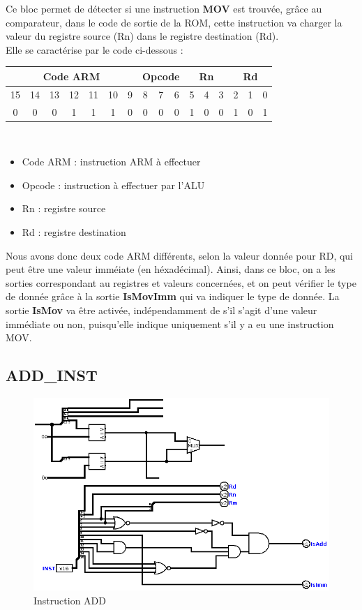 \documentclass[a4paper]{article} %
\begin{document}
\medskip

Ce bloc permet de détecter si une instruction \textbf{MOV} est trouvée, grâce au comparateur, dans le code de sortie de la ROM, cette instruction va charger la valeur du registre source (Rn) dans le registre destination (Rd).\\
Elle se caractérise par le code ci-dessous : 
\\
\begin{tabular}{|ccccccc|ccc|ccc|ccc|}
    \hline
    \multicolumn{7}{|c|}{Code ARM}  & \multicolumn{3}{|c|}{Opcode} & \multicolumn{3}{|c|}{Rn} & \multicolumn{3}{|c|}{Rd}\\
    \hline
    15 & 14 & 13 & 12 & 11 & 10 & 9 & 8 & 7 & 6                    & 5 & 4 & 3                & 2 & 1 & 0 \\
    \hline
    0  & 0  & 0  & 1  & 1  & 1  & 0 & 0 & 0 & 0                    & 1 & 0 & 0                & 1 & 0 & 1 \\
    \hline     
    \end{tabular}
\\

\begin{itemize}
    \item     Code ARM : instruction ARM à effectuer
    \item     Opcode : instruction à effectuer par l'ALU
    \item     Rn : registre source
    \item     Rd : registre destination
\end{itemize}

\medskip
Nous avons donc deux code ARM différents, selon la valeur donnée pour RD, qui peut être une valeur imméiate (en héxadécimal). Ainsi, dans ce bloc, on a les sorties correspondant au registres et valeurs concernées, et on peut vérifier le type de donnée grâce à la sortie \textbf{IsMovImm} qui va indiquer le type de donnée. La sortie \textbf{IsMov} va être activée, indépendamment de s'il s'agit d'une valeur immédiate ou non, puisqu'elle indique uniquement s'il y a eu une instruction MOV.



\subsection{ADD\_INST} \label{addinst}
\begin{figure}[H]
    \centering
    \includegraphics[width=.8\textwidth]{src/ADD_INST.png}
    \caption{Instruction ADD}
    \label{add_img}
\end{figure}
\end{document}
